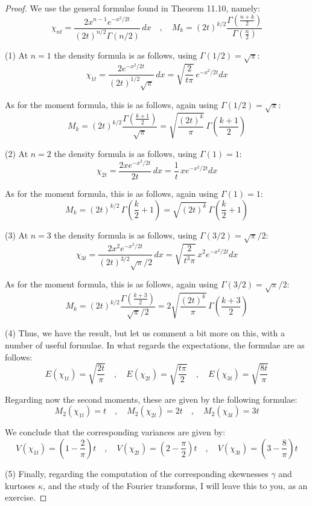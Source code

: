\documentclass[12pt]{amsbook}
\begin{document}
\begin{proof}
We use the general formulae found in Theorem 11.10, namely:
$$\chi_{nt}=\frac{2x^{n-1}e^{-x^2/2t}}{(2t)^{n/2}\Gamma(n/2)}\,dx\quad,\quad 
M_k=(2t)^{k/2}\frac{\Gamma\left(\frac{n+k}{2}\right)}{\Gamma\left(\frac{n}{2}\right)}$$

(1) At $n=1$ the density formula is as follows, using $\Gamma(1/2)=\sqrt{\pi}$:
$$\chi_{1t}=\frac{2e^{-x^2/2t}}{(2t)^{1/2}\sqrt{\pi}}\,dx=\sqrt{\frac{2}{t\pi}}\,e^{-x^2/2t}dx$$

As for the moment formula, this is as follows, again using $\Gamma(1/2)=\sqrt{\pi}$:
$$M_k=(2t)^{k/2}\frac{\Gamma\left(\frac{k+1}{2}\right)}{\sqrt{\pi}}
=\sqrt{\frac{(2t)^k}{\pi}}\,\Gamma\left(\frac{k+1}{2}\right)$$

(2) At $n=2$ the density formula is as follows, using $\Gamma(1)=1$:
$$\chi_{2t}=\frac{2xe^{-x^2/2t}}{2t}\,dx=\frac{1}{t}\,xe^{-x^2/2t}dx$$

As for the moment formula, this is as follows, again using $\Gamma(1)=1$:
$$M_k=(2t)^{k/2}\,\Gamma\left(\frac{k}{2}+1\right)
=\sqrt{(2t)^k}\,\Gamma\left(\frac{k}{2}+1\right)$$

(3) At $n=3$ the density formula is as follows, using $\Gamma(3/2)=\sqrt{\pi}/2$:
$$\chi_{3t}=\frac{2x^2e^{-x^2/2t}}{(2t)^{3/2}\sqrt{\pi}/2}\,dx
=\sqrt{\frac{2}{t^3\pi}}\,x^2e^{-x^2/2t}dx$$

As for the moment formula, this is as follows, again using $\Gamma(3/2)=\sqrt{\pi}/2$:
$$M_k=(2t)^{k/2}\frac{\Gamma\left(\frac{k+3}{2}\right)}{\sqrt{\pi}/2}
=2\sqrt{\frac{(2t)^k}{\pi}}\,\Gamma\left(\frac{k+3}{2}\right)$$

(4) Thus, we have the result, but let us comment a bit more on this, with a number of useful formulae. In what regards the expectations, the formulae are as follows:
$$E(\chi_{1t})=\sqrt{\frac{2t}{\pi}}\quad,\quad 
E(\chi_{2t})=\sqrt{\frac{t\pi}{2}}\quad,\quad 
E(\chi_{3t})=\sqrt{\frac{8t}{\pi}}$$

Regarding now the second moments, these are given by the following formulae:
$$M_2(\chi_{1t})=t\quad,\quad 
M_2(\chi_{2t})=2t\quad,\quad 
M_2(\chi_{3t})=3t$$

We conclude that the corresponding variances are given by:
$$V(\chi_{1t})=\left(1-\frac{2}{\pi}\right)t\quad,\quad
V(\chi_{2t})=\left(2-\frac{\pi}{2}\right)t\quad,\quad
V(\chi_{3t})=\left(3-\frac{8}{\pi}\right)t$$

(5) Finally, regarding the computation of the corresponding skewnesses $\gamma$ and kurtoses $\kappa$, and the study of the Fourier transforms, I will leave this to you, as an exercise.
\end{proof}
\end{document}
